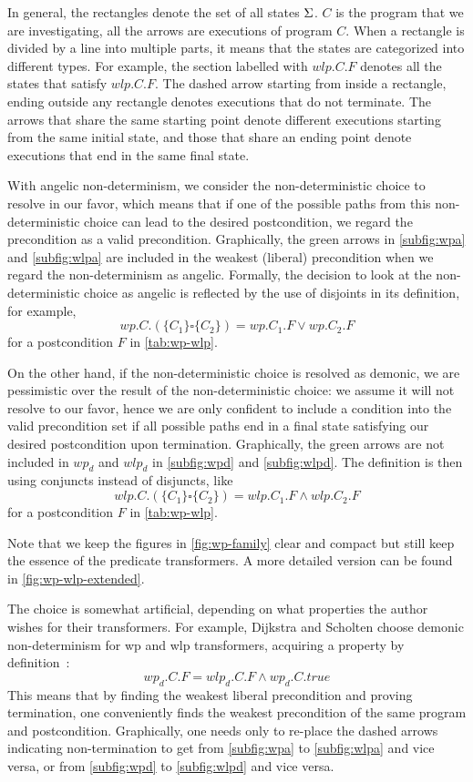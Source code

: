 In general, the rectangles denote the set of all states $\S$. 
$C$ is the program that we are investigating, all the arrows are executions of program $C$. 
When a rectangle is divided by a line into multiple parts, it means that the states are categorized into different types. 
For example, the section  labelled with $wlp.C.F$ denotes all the states that satisfy $wlp.C.F$. 
The dashed arrow starting from inside a rectangle, ending outside any rectangle denotes executions that do not terminate. 
The arrows that share the same starting point denote different executions starting from the same initial state, and those that share an ending point denote executions that end in the same final state. 

With angelic non-determinism, we consider the non-deterministic choice to resolve in our favor, which means that if one of the possible paths from this non-deterministic choice can lead to the desired postcondition, we regard the precondition as a valid precondition. 
Graphically, the green arrows in \autoref{subfig:wpa} and \autoref{subfig:wlpa} are included in the weakest (liberal) precondition when we regard the non-determinism as angelic. 
Formally, the decision to look at the non-deterministic choice as angelic is reflected by the use of disjoints in its definition, for example, 
$$wp.C.(\{C_1\}\square \{C_2\}) = wp.C_1.F\vee wp.C_2.F$$ for a postcondition $F$ in \autoref{tab:wp-wlp}.

On the other hand, if the non-deterministic choice is resolved as demonic, we are pessimistic over the result of the non-deterministic choice: we assume it will not resolve to our favor, hence we are only confident to include a condition into the valid precondition set if all possible paths end in a final state satisfying our desired postcondition upon termination. 
Graphically, the green arrows are not included in $wp_d$ and $wlp_d$ in \autoref{subfig:wpd} and \autoref{subfig:wlpd}. 
The definition is then using conjuncts instead of disjuncts, like 
$$wlp.C.(\{C_1\}\square \{C_2\}) = wlp.C_1.F\wedge wlp.C_2.F$$ for a postcondition $F$ in \autoref{tab:wp-wlp}.

Note that we keep the figures in \autoref{fig:wp-family} clear and compact but still keep the essence of the predicate transformers. 
A more detailed version can be found in \autoref{fig:wp-wlp-extended}.  

The choice is somewhat artificial, depending on what properties the author wishes for their transformers.
For example, Dijkstra and Scholten choose demonic non-determinism for wp and wlp transformers, acquiring a property by definition~\cite{dijkstra90}: 
$$wp_d.C.F = wlp_d.C.F \wedge wp_d.C.true $$
This means that by finding the weakest liberal precondition and proving termination, one conveniently finds the weakest precondition of the same program and postcondition. 
Graphically, one needs only to re-place the dashed arrows indicating non-termination to get from \autoref{subfig:wpa} to \autoref{subfig:wlpa} and vice versa, or from  \autoref{subfig:wpd} to \autoref{subfig:wlpd} and vice versa. 

